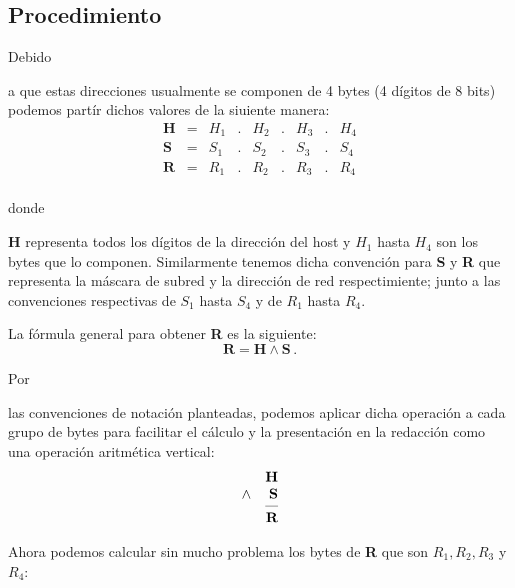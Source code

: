 \documentclass[stu, 12pt, letterpaper, donotrepeattitle, floatsintext, natbib]{apa7}
\begin{document}
\subsection*{Procedimiento}
Debido \begin{justifying}
    a que estas direcciones usualmente se componen de 4 bytes (4 dígitos de 8 bits) podemos partír dichos valores de la siuiente manera:
    \[ \begin{matrix}
        \textbf{H} & = & H_1&.&H_2&.&H_3&.&H_4 \\
        \textbf{S} & = & S_1&.&S_2&.&S_3&.&S_4 \\
        \textbf{R} & = & R_1&.&R_2&.&R_3&.&R_4 \\
        \end{matrix}  \]\par
\end{justifying}
donde \begin{justifying}
    \textbf{H} representa todos los dígitos de la dirección del host y $H_1$ hasta $H_4$ son los bytes que lo componen.
Similarmente tenemos dicha convención para \textbf{S} y \textbf{R} que representa la máscara de subred y la dirección de red respectimiente;
junto a las convenciones respectivas de $S_1$ hasta $S_4$ y de $R_1$ hasta $R_4$.\par
    \end{justifying}
    \vspace{\baselineskip}
La fórmula general para obtener \textbf{R} es la siguiente:
\[\textbf{R}=\textbf{H}\land\textbf{S}\, .\]\par 
Por \begin{justifying}
    las convenciones de notación planteadas, podemos aplicar dicha operación a cada grupo de bytes para facilitar el cálculo y 
la presentación en la redacción como una operación aritmética vertical:
\[
\begin{array}{lr}
   & \textbf{H}  \\
\land  & \textbf{S} \\
\cmidrule(lr){2-2}
  & \textbf{R}  \\
\end{array}
\]
\end{justifying}\par
\vspace{\baselineskip}
Ahora podemos calcular sin mucho problema los bytes de \textbf{R} que son $R_1, R_2, R_3$ y $R_4$:
\end{document}

